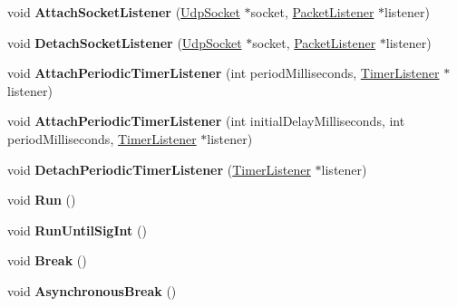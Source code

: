 \begin{DoxyCompactItemize}
\item 
\mbox{\label{class_socket_receive_multiplexer_a701eacde4f5a7660a5ad1a15393e5b78}} 
void {\bfseries Attach\+Socket\+Listener} (\hyperlink{class_udp_socket}{Udp\+Socket} $\ast$socket, \hyperlink{class_packet_listener}{Packet\+Listener} $\ast$listener)
\item 
\mbox{\label{class_socket_receive_multiplexer_ad32a9df078e53e29a175434a2888e192}} 
void {\bfseries Detach\+Socket\+Listener} (\hyperlink{class_udp_socket}{Udp\+Socket} $\ast$socket, \hyperlink{class_packet_listener}{Packet\+Listener} $\ast$listener)
\item 
\mbox{\label{class_socket_receive_multiplexer_a49a6c89a5faa438ae33d5c98e3cbdd91}} 
void {\bfseries Attach\+Periodic\+Timer\+Listener} (int period\+Milliseconds, \hyperlink{class_timer_listener}{Timer\+Listener} $\ast$listener)
\item 
\mbox{\label{class_socket_receive_multiplexer_ac99b05741637c3221d4c5b4b02ce6220}} 
void {\bfseries Attach\+Periodic\+Timer\+Listener} (int initial\+Delay\+Milliseconds, int period\+Milliseconds, \hyperlink{class_timer_listener}{Timer\+Listener} $\ast$listener)
\item 
\mbox{\label{class_socket_receive_multiplexer_a8950d0673b56382cb837cf0cfe6b2d57}} 
void {\bfseries Detach\+Periodic\+Timer\+Listener} (\hyperlink{class_timer_listener}{Timer\+Listener} $\ast$listener)
\item 
\mbox{\label{class_socket_receive_multiplexer_a80f556e8526d80e09b8fa23fab3f0597}} 
void {\bfseries Run} ()
\item 
\mbox{\label{class_socket_receive_multiplexer_a2f4ffbd85657b9e9e19fe2db461a33c3}} 
void {\bfseries Run\+Until\+Sig\+Int} ()
\item 
\mbox{\label{class_socket_receive_multiplexer_ac42f8b21c4bd9ab1c4205fc5e0703f21}} 
void {\bfseries Break} ()
\item 
\mbox{\label{class_socket_receive_multiplexer_ac410747ebb31cfa4e322891604b09e30}} 
void {\bfseries Asynchronous\+Break} ()
\end{DoxyCompactItemize}
